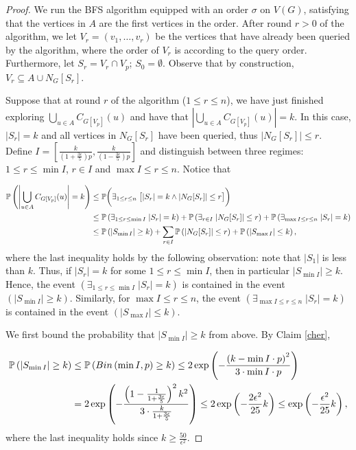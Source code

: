 \documentclass[notitlepage]{scrartcl}
\begin{document}
\begin{proof}
    We run the BFS algorithm equipped with an order $\sigma$ on $V(G)$, satisfying that the vertices in $A$ are the first vertices in the order.
    After round $r>0$ of the algorithm, we let $V_r=(v_1,\dots,v_r)$ be the vertices that have already been queried by the algorithm, where the order of $V_r$ is according to the query order. Furthermore, let $S_r=V_r\cap V_p$; $S_0=\emptyset$. Observe that by construction, $V_r\subseteq A\cup N_G[S_r]$.

    Suppose that at round $r$ of the algorithm ($1\le r \le n$), we have just finished exploring $\bigcup_{u\in A} C_{G[V_p]}(u)$ and have that $\left|\bigcup_{u\in A} C_{G[V_p]}(u)\right|=k$. In this case, $|S_r|=k$ and all vertices in $N_G[S_r]$ have been queried, thus $|N_G[S_r]|\le r$. Define $I=\left[\frac{k}{\left(1+\frac{3\epsilon}{5}\right)p},\frac{k}{\left(1-\frac{3\epsilon}{5}\right)p}\right]$ and distinguish between three regimes: $1\le r\le \min I$, $r\in I$ and $\max I\le r\le n$. Notice that

    \begin{align}\label{maineq}
    \notag
        \mathbb{P}\left(\left|\bigcup_{u\in A} C_{G[V_p]}(u)\right|=k\right)&\le \mathbb{P}\bigg(\exists_{1\le r\le n}\;\big[|S_r|=k\wedge |N_G[S_r]|\le r\big]\bigg)\\\notag
        &\le \mathbb{P}\left(\exists_{1\le r\le \min I}\;|S_r|=k\right)+\mathbb{P}\left(\exists_{r\in I}\;|N_G[S_r]|\le r\right)+\mathbb{P}\left(\exists_{\max I\le r\le n}\;|S_r|=k\right)\\
        &\le \mathbb{P}\left(|S_{\min I}|\ge k\right)+\sum_{r\in I}\mathbb{P}\left(|N_G[S_r]|\le r\right)+\mathbb{P}\left(|S_{\max I}|\le k\right),
    \end{align}
    where the last inequality holds by the following observation: note that $|S_1|$ is less than $k$. Thus, if $|S_r|=k$ for some $1\le r \le \min I$, then in particular $|S_{\min I}|\ge k$. Hence, the event $\left(\exists_{1\le r\le \min I}\;|S_r|=k\right)$ is contained in the event $\left(|S_{\min I}|\ge k\right)$. Similarly, for $\max I\le r\le n$, the event $\left(\exists_{\max I\le r\le n}\;|S_r|=k\right)$ is contained in the event $\left(|S_{\max I}|\le k\right)$.

    We first bound the probability that $|S_{\min I}|\ge k$ from above. By Claim \ref{cher},
    
    \begin{align}\label{start}
    \notag
    \mathbb{P}\left(|S_{\min I}|\ge k\right)&\le\mathbb{P}\left(Bin\left(\min I,p\right)\ge k\right)\le 2\exp\left(-\frac{\left(k-\min I\cdot p\right)^2}{3\cdot \min I\cdot p}\right)\\
    &=2\exp\left(-\frac{\left(1-\frac{1}{1+\frac{3\epsilon}{5}}\right)^2k^2}{3\cdot \frac{k}{1+\frac{3\epsilon}{5}}}\right)\le 2\exp\left(-\frac{2\epsilon^2}{25}k\right)\le \exp\left(-\frac{\epsilon^2}{25}k\right),
    \end{align}
    where the last inequality holds since $k\ge \frac{50}{\epsilon^2}$.


\end{proof}
\end{document}
